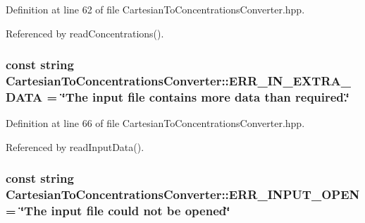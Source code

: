 \-Definition at line 62 of file \-Cartesian\-To\-Concentrations\-Converter.\-hpp.



\-Referenced by read\-Concentrations().

\hypertarget{classmultiscale_1_1video_1_1CartesianToConcentrationsConverter_a9653da0f45a36f52e85a243bb975f76e}{
\subsubsection[{\-E\-R\-R\-\_\-\-I\-N\-\_\-\-E\-X\-T\-R\-A\-\_\-\-D\-A\-T\-A}]{\setlength{\rightskip}{0pt plus 5cm}const string {\bf \-Cartesian\-To\-Concentrations\-Converter\-::\-E\-R\-R\-\_\-\-I\-N\-\_\-\-E\-X\-T\-R\-A\-\_\-\-D\-A\-T\-A} = \char`\"{}\-The input file contains more data than required.\char`\"{}}}\label{classmultiscale_1_1video_1_1CartesianToConcentrationsConverter_a9653da0f45a36f52e85a243bb975f76e}


\-Definition at line 66 of file \-Cartesian\-To\-Concentrations\-Converter.\-hpp.



\-Referenced by read\-Input\-Data().

\hypertarget{classmultiscale_1_1video_1_1CartesianToConcentrationsConverter_a0ed0c4079a6eb5191409a3c670cdeb04}{
\subsubsection[{\-E\-R\-R\-\_\-\-I\-N\-P\-U\-T\-\_\-\-O\-P\-E\-N}]{\setlength{\rightskip}{0pt plus 5cm}const string {\bf \-Cartesian\-To\-Concentrations\-Converter\-::\-E\-R\-R\-\_\-\-I\-N\-P\-U\-T\-\_\-\-O\-P\-E\-N} = \char`\"{}\-The input file could not be opened\char`\"{}}}\label{classmultiscale_1_1video_1_1CartesianToConcentrationsConverter_a0ed0c4079a6eb5191409a3c670cdeb04}


